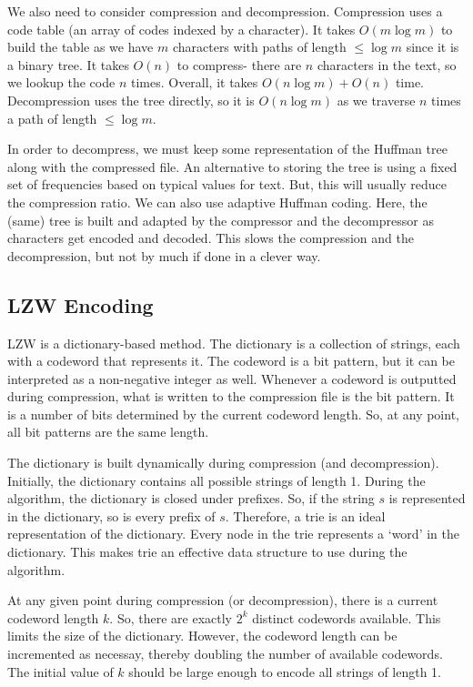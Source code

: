 \documentclass[a4paper, openany]{memoir}
\begin{document}
We also need to consider compression and decompression. Compression uses a code table (an array of codes indexed by a character). It takes $O(m \log m)$ to build the table as we have $m$ characters with paths of length $\leq \log m$ since it is a binary tree. It takes $O(n)$ to compress- there are $n$ characters in the text, so we lookup the code $n$ times. Overall, it takes $O(n \log m) + O(n)$ time. Decompression uses the tree directly, so it is $O(n \log m)$ as we traverse $n$ times a path of length $\leq \log m$.

In order to decompress, we must keep some representation of the Huffman tree along with the compressed file. An alternative to storing the tree is using a fixed set of frequencies based on typical values for text. But, this will usually reduce the compression ratio. We can also use adaptive Huffman coding. Here, the (same) tree is built and adapted by the compressor and the decompressor as characters get encoded and decoded. This slows the compression and the decompression, but not by much if done in a clever way.

\subsection{LZW Encoding}
LZW is a dictionary-based method. The dictionary is a collection of strings, each with a codeword that represents it. The codeword is a bit pattern, but it can be interpreted as a non-negative integer as well. Whenever a codeword is outputted during compression, what is written to the compression file is the bit pattern. It is a number of bits determined by the current codeword length. So, at any point, all bit patterns are the same length.

The dictionary is built dynamically during compression (and decompression). Initially, the dictionary contains all possible strings of length 1. During the algorithm, the dictionary is closed under prefixes. So, if the string $s$ is represented in the dictionary, so is every prefix of $s$. Therefore, a trie is an ideal representation of the dictionary. Every node in the trie represents a `word' in the dictionary. This makes trie an effective data structure to use during the algorithm.

At any given point during compression (or decompression), there is a current codeword length $k$. So, there are exactly $2^k$ distinct codewords available. This limits the size of the dictionary. However, the codeword length can be incremented as necessay, thereby doubling the number of available codewords. The initial value of $k$ should be large enough to encode all strings of length 1.
\end{document}

